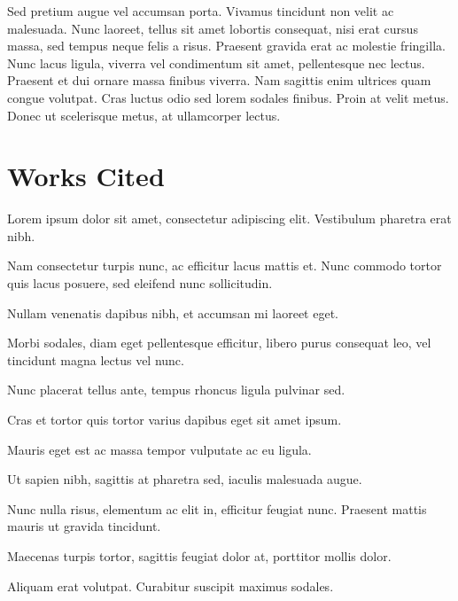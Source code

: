 \documentclass[a4paper]{memoir}
\begin{document}
Sed pretium augue vel accumsan porta. Vivamus tincidunt non velit ac malesuada. Nunc laoreet, tellus sit amet lobortis consequat, nisi erat cursus massa, sed tempus neque felis a risus. Praesent gravida erat ac molestie fringilla. Nunc lacus ligula, viverra vel condimentum sit amet, pellentesque nec lectus. Praesent et dui ornare massa finibus viverra. Nam sagittis enim ultrices quam congue volutpat. Cras luctus odio sed lorem sodales finibus. Proin at velit metus. Donec ut scelerisque metus, at ullamcorper lectus. 

\chapter*{Works Cited}
\label{workscited}

Lorem ipsum dolor sit amet, consectetur adipiscing elit. Vestibulum pharetra erat nibh.

Nam consectetur turpis nunc, ac efficitur lacus mattis et. Nunc commodo tortor quis lacus posuere, sed eleifend nunc sollicitudin.

Nullam venenatis dapibus nibh, et accumsan mi laoreet eget.

Morbi sodales, diam eget pellentesque efficitur, libero purus consequat leo, vel tincidunt magna lectus vel nunc.

Nunc placerat tellus ante, tempus rhoncus ligula pulvinar sed.

Cras et tortor quis tortor varius dapibus eget sit amet ipsum.

Mauris eget est ac massa tempor vulputate ac eu ligula.

Ut sapien nibh, sagittis at pharetra sed, iaculis malesuada augue.

Nunc nulla risus, elementum ac elit in, efficitur feugiat nunc. Praesent mattis mauris ut gravida tincidunt.

Maecenas turpis tortor, sagittis feugiat dolor at, porttitor mollis dolor. 

Aliquam erat volutpat. Curabitur suscipit maximus sodales.

\backmatter
\end{document}
